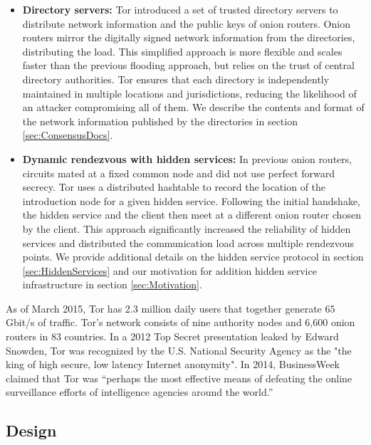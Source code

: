 \begin{itemize}
	\item \textbf{Directory servers:} Tor introduced a set of trusted directory servers to distribute network information and the public keys of onion routers. Onion routers mirror the digitally signed network information from the directories, distributing the load. This simplified approach is more flexible and scales faster than the previous flooding approach, but relies on the trust of central directory authorities. Tor ensures that each directory is independently maintained in multiple locations and jurisdictions, reducing the likelihood of an attacker compromising all of them.\cite{syverson2011peel} We describe the contents and format of the network information published by the directories in section \ref{sec:ConsensusDocs}.
	\item \textbf{Dynamic rendezvous with hidden services:} In previous onion routers, circuits mated at a fixed common node and did not use perfect forward secrecy. Tor uses a distributed hashtable to record the location of the introduction node for a given hidden service. Following the initial handshake, the hidden service and the client then meet at a different onion router chosen by the client. This approach significantly increased the reliability of hidden services and distributed the communication load across multiple rendezvous points.\cite{dingledine2004tor} We provide additional details on the hidden service protocol in section \ref{sec:HiddenServices} and our motivation for addition hidden service infrastructure in section \ref{sec:Motivation}.
\end{itemize}

As of March 2015, Tor has 2.3 million daily users that together generate 65 Gbit/s of traffic. Tor's network consists of nine authority nodes and 6,600 onion routers in 83 countries.\cite{TorMetrics} In a 2012 Top Secret presentation leaked by Edward Snowden, Tor was recognized by the U.S. National Security Agency as the "the king of high secure, low latency Internet anonymity".\cite{landau2014highlights} \cite{plak2014anonymous} In 2014, BusinessWeek claimed that Tor was ``perhaps the most effective means of defeating the online surveillance efforts of intelligence agencies around the world.''\cite{TorBusinessWeek}

\subsection{Design}

